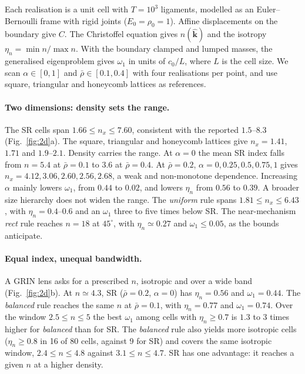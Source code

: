 \documentclass[aps,prl,twocolumn,superscriptaddress,amsmath,amssymb,floatfix]{revtex4-2}
\begin{document}
Each realisation is a unit cell with $T=10^3$ ligaments, modelled as an
Euler--Bernoulli frame with rigid joints ($E_0=\rho_0=1$). Affine displacements on the
boundary give $C$. The Christoffel equation gives $n(\hat{\bm k})$ and the isotropy
$\eta_n=\min n/\max n$. With the boundary clamped and lumped masses, the generalised
eigenproblem gives $\omega_1$ in units of $c_0/L$, where $L$ is the cell size. We scan
$\alpha\in[0,1]$ and $\bar\rho\in[0.1,0.4]$ with four realisations per point, and use
square, triangular and honeycomb lattices as references.

\paragraph*{Two dimensions: density sets the range.}
The SR cells span $1.66\le n_x\le7.60$, consistent with the reported
$1.5$--$8.3$~\cite{both2026} (Fig.~\ref{fig:2d}a). The square, triangular and honeycomb
lattices give $n_x=1.41$, $1.71$ and $1.9$--$2.1$. Density carries the range. At
$\alpha=0$ the mean SR index falls from $n=5.4$ at $\bar\rho=0.1$ to $3.6$ at
$\bar\rho=0.4$. At $\bar\rho=0.2$, $\alpha=0,0.25,0.5,0.75,1$ gives
$n_x=4.12,3.06,2.60,2.56,2.68$, a weak and non-monotone dependence. Increasing $\alpha$
mainly lowers $\omega_1$, from $0.44$ to $0.02$, and lowers $\eta_n$ from $0.56$ to
$0.39$. A broader size hierarchy does not widen the range. The \emph{uniform} rule spans
$1.81\le n_x\le6.43$, with $\eta_n=0.4$--$0.6$ and an $\omega_1$ three to five times
below SR. The near-mechanism \emph{rect} rule reaches $n=18$ at $45^\circ$, with
$\eta_n\simeq0.27$ and $\omega_1\le0.05$, as the bounds anticipate.

\paragraph*{Equal index, unequal bandwidth.}
A GRIN lens asks for a prescribed $n$, isotropic and over a wide band
(Fig.~\ref{fig:2d}b). At $n\simeq4.3$, SR ($\bar\rho=0.2$, $\alpha=0$) has
$\eta_n=0.56$ and $\omega_1=0.44$. The \emph{balanced} rule reaches the same $n$ at
$\bar\rho=0.1$, with $\eta_n=0.77$ and $\omega_1=0.74$. Over the window $2.5\le n\le5$
the best $\omega_1$ among cells with $\eta_n\ge0.7$ is $1.3$ to $3$ times higher for
\emph{balanced} than for SR. The \emph{balanced} rule also yields more isotropic cells
($\eta_n\ge0.8$ in 16 of 80 cells, against 9 for SR) and covers the same isotropic
window, $2.4\le n\le4.8$ against $3.1\le n\le4.7$. SR has one advantage: it reaches a
given $n$ at a higher density.
\end{document}
